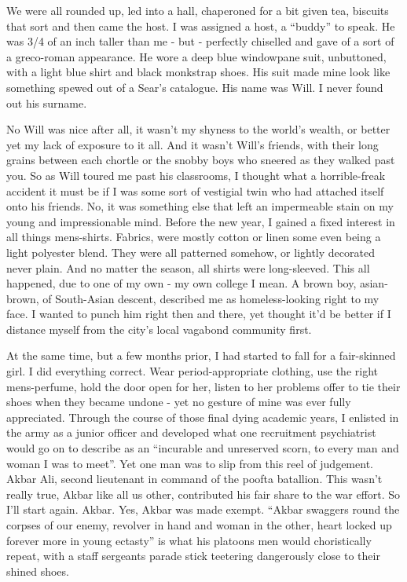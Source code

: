 \documentclass[19pt,openany]{book}
\begin{document}
We were all rounded up, led into a hall,
chaperoned for a bit given tea, biscuits that
sort and then came the host. I was
assigned a host, a ``buddy'' to speak.
He was 3/4 of an inch taller than me - but -
perfectly chiselled and gave of a sort
of a greco-roman appearance. He wore a deep blue
windowpane suit, unbuttoned, with a light blue shirt
and black monkstrap shoes. His suit made mine
look like something spewed out of a Sear's catalogue.
His name was Will. I never found out his surname.

No Will was nice after all, it wasn't my shyness
to the world's wealth, or better yet my lack of exposure
to it all. And it wasn't Will's friends, with
their long grains between each chortle
or the snobby boys who sneered as they walked past
you. So as Will
toured me past his classrooms,
I thought what a horrible-freak
accident it must be if I was some sort
of vestigial twin who had attached itself
onto his friends. No, it
was something else that left an impermeable
stain on my young and impressionable mind.
Before the new year, I gained a fixed interest
in all things mens-shirts. Fabrics,
were mostly cotton or linen some even being a light
polyester blend. They were all patterned
somehow, or lightly decorated never plain. And
no matter the season, all shirts were long-sleeved.
This all happened, due to one of my own - my own college
I mean. A brown boy, asian-brown, of South-Asian descent, described
me as homeless-looking right to my face. I wanted
to punch him right then and there, yet thought
it'd be better if I distance myself from the city's local
vagabond community first.

At the same time, but a few months prior, I had
started to fall for a fair-skinned girl. I did
everything correct. Wear period-appropriate
clothing, use the right mens-perfume, hold the door
open for her, listen to her problems
offer to tie their shoes when they became undone
- yet no gesture of mine was ever fully appreciated.
Through the course of those final dying
academic years, I enlisted in the army as a junior
officer and developed what one recruitment
psychiatrist would go on to describe as an
``incurable and unreserved scorn, to every man
and woman I was to meet''. Yet one man was
to slip from this reel of judgement.
Akbar Ali, second lieutenant in command
of the poofta batallion.
This wasn't really true, Akbar
like all us other, contributed
his fair share to the war effort.
So I'll start again. Akbar. Yes, Akbar
was made exempt.
``Akbar swaggers round the corpses
of our enemy, revolver in hand
and woman in the other,
heart locked up forever more in
young ectasty'' is what his platoons men
would choristically repeat, with a staff
sergeants parade stick teetering dangerously
close to their shined shoes.
\end{document}
